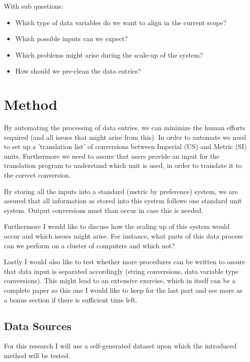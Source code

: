\documentclass[sigchi, nonacm]{acmart}
\begin{document}
With sub questions:
\begin{itemize}
	\item{Which type of data variables do we want to align in the current scope?}
    \item{Which possible inputs can we expect?}
    \item{Which problems might arise during the scale-up of the system?}
\end{itemize}

\begin{itemize}
    \item{How should we pre-clean the data entries?}
\end{itemize}







\section{Method}
By automating the processing of data entries, we can minimize the human efforts required (and all issues that might arise from this). In order to automate we need to set up a 'translation list' of conversions between Imperial (US) and Metric (SI) units. Furthermore we need to assure that users provide an input for the translation program to understand which unit is used, in order to translate it to the correct conversion.

By storing all the inputs into a standard (metric by preference) system, we are assured that all information as stored into this system follows one standard unit system. Output conversions must than occur in case this is needed.

Furthermore I would like to discuss how the scaling up of this system would occur and which issues might arise. For instance, what parts of this data process can we perform on a cluster of computers and which not?

Lastly I would also like to test whether more procedures can be written to assure that data input is separated accordingly (string conversions, data variable type conversions). This might lead to an extensive exercise, which in itself can be a complete paper so this one I would like to keep for the last part and see more as a bonus section if there is sufficient time left.

\subsection{Data Sources}
For this research I will use a self-generated dataset upon which the introduced method will be tested.
\end{document}
